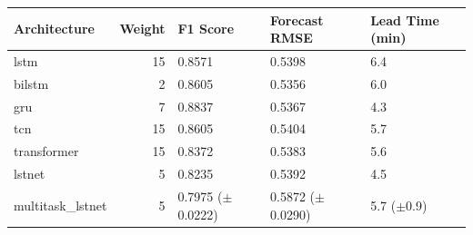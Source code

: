 \begin{tabular}{lrlll}
\toprule
Architecture & Weight & F1 Score & Forecast RMSE & Lead Time (min) \\
\midrule
lstm & 15 & 0.8571 & 0.5398 & 6.4 \\
bilstm & 2 & 0.8605 & 0.5356 & 6.0 \\
gru & 7 & 0.8837 & 0.5367 & 4.3 \\
tcn & 15 & 0.8605 & 0.5404 & 5.7 \\
transformer & 15 & 0.8372 & 0.5383 & 5.6 \\
lstnet & 5 & 0.8235 & 0.5392 & 4.5 \\
multitask_lstnet & 5 & 0.7975 ($\pm$0.0222) & 0.5872 ($\pm$0.0290) & 5.7 ($\pm$0.9) \\
\bottomrule
\end{tabular}
